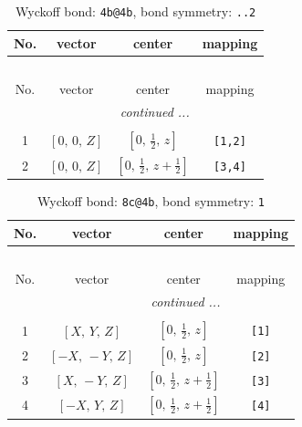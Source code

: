 \documentclass[fleqn,8pt]{jsarticle}
\begin{document}
\renewcommand{\arraystretch}{1.2}
\begin{longtable}{cccc}
\caption{Wyckoff bond: {\tt 4b@4b}, bond symmetry: {\tt ..2}}
 \\
 \hline \hline
No. & vector & center & mapping \\ \hline \endfirsthead

\multicolumn{3}{l}{\tablename\ \thetable{}} \\
 \hline \hline
No. & vector & center & mapping \\ \hline \endhead

 \hline \hline
\multicolumn{3}{r}{\footnotesize\it continued ...} \\ \endfoot

 \hline \hline
\multicolumn{3}{r}{} \\ \endlastfoot

1 & $\left[ 0,\, 0,\, Z \right]$ & $\left[ 0,\, \frac{1}{2},\, z \right]$ & {\tt [1,2]} \\ \hline
2 & $\left[ 0,\, 0,\, Z \right]$ & $\left[ 0,\, \frac{1}{2},\, z + \frac{1}{2} \right]$ & {\tt [3,4]} \\
\end{longtable}
\renewcommand{\arraystretch}{1.2}
\begin{longtable}{cccc}
\caption{Wyckoff bond: {\tt 8c@4b}, bond symmetry: {\tt 1}}
 \\
 \hline \hline
No. & vector & center & mapping \\ \hline \endfirsthead

\multicolumn{3}{l}{\tablename\ \thetable{}} \\
 \hline \hline
No. & vector & center & mapping \\ \hline \endhead

 \hline \hline
\multicolumn{3}{r}{\footnotesize\it continued ...} \\ \endfoot

 \hline \hline
\multicolumn{3}{r}{} \\ \endlastfoot

1 & $\left[ X,\, Y,\, Z \right]$ & $\left[ 0,\, \frac{1}{2},\, z \right]$ & {\tt [1]} \\ \hline
2 & $\left[ - X,\, - Y,\, Z \right]$ & $\left[ 0,\, \frac{1}{2},\, z \right]$ & {\tt [2]} \\ \hline
3 & $\left[ X,\, - Y,\, Z \right]$ & $\left[ 0,\, \frac{1}{2},\, z + \frac{1}{2} \right]$ & {\tt [3]} \\ \hline
4 & $\left[ - X,\, Y,\, Z \right]$ & $\left[ 0,\, \frac{1}{2},\, z + \frac{1}{2} \right]$ & {\tt [4]} \\
\end{longtable}
\end{document}
